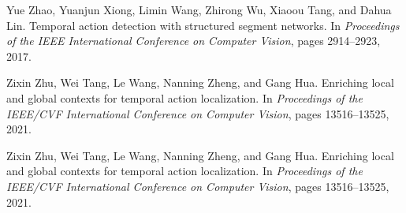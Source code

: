\documentclass[10pt,twocolumn,letterpaper]{article}
\begin{document}
{\begin{thebibliography}{10}
Yue Zhao, Yuanjun Xiong, Limin Wang, Zhirong Wu, Xiaoou Tang, and Dahua Lin.
\newblock Temporal action detection with structured segment networks.
\newblock In {\em Proceedings of the IEEE International Conference on Computer
  Vision}, pages 2914--2923, 2017.

Zixin Zhu, Wei Tang, Le Wang, Nanning Zheng, and Gang Hua.
\newblock Enriching local and global contexts for temporal action localization.
\newblock In {\em Proceedings of the IEEE/CVF International Conference on
  Computer Vision}, pages 13516--13525, 2021.

Zixin Zhu, Wei Tang, Le Wang, Nanning Zheng, and Gang Hua.
\newblock Enriching local and global contexts for temporal action localization.
\newblock In {\em Proceedings of the IEEE/CVF International Conference on
  Computer Vision}, pages 13516--13525, 2021.

\end{thebibliography}
 

}
\end{document}
